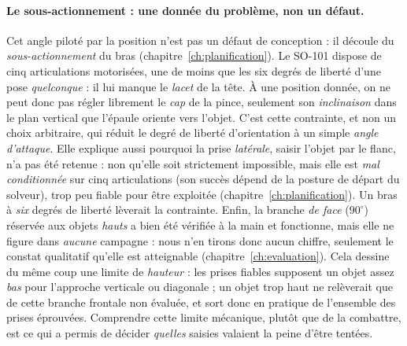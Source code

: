 \paragraph{Le sous-actionnement : une donnée du problème, non un défaut.}
Cet angle piloté par la position n'est pas un défaut de conception : il découle du \emph{sous-actionnement} du bras (chapitre~\ref{ch:planification}). Le SO-101 dispose de cinq articulations motorisées, une de moins que les six degrés de liberté d'une pose \emph{quelconque} : il lui manque le \emph{lacet} de la tête. À une position donnée, on ne peut donc pas régler librement le \emph{cap} de la pince, seulement son \emph{inclinaison} dans le plan vertical que l'épaule oriente vers l'objet. C'est cette contrainte, et non un choix arbitraire, qui réduit le degré de liberté d'orientation à un simple \emph{angle d'attaque}. Elle explique aussi pourquoi la prise \emph{latérale}, saisir l'objet par le flanc, n'a pas été retenue : non qu'elle soit strictement impossible, mais elle est \emph{mal conditionnée} sur cinq articulations (son succès dépend de la posture de départ du solveur), trop peu fiable pour être exploitée (chapitre~\ref{ch:planification}). Un bras à \emph{six} degrés de liberté lèverait la contrainte. Enfin, la branche \emph{de face} ($90^{\circ}$) réservée aux objets \emph{hauts} a bien été vérifiée à la main et fonctionne, mais elle ne figure dans \emph{aucune} campagne : nous n'en tirons donc aucun chiffre, seulement le constat qualitatif qu'elle est atteignable (chapitre~\ref{ch:evaluation}). Cela dessine du même coup une limite de \emph{hauteur} : les prises fiables supposent un objet assez \emph{bas} pour l'approche verticale ou diagonale ; un objet trop haut ne relèverait que de cette branche frontale non évaluée, et sort donc en pratique de l'ensemble des prises éprouvées. Comprendre cette limite mécanique, plutôt que de la combattre, est ce qui a permis de décider \emph{quelles} saisies valaient la peine d'être tentées.

